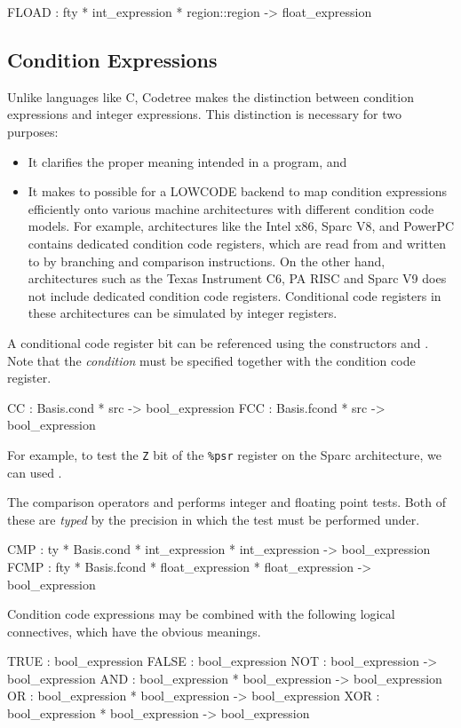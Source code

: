 \begin{SML}
   FLOAD : fty * int_expression * region::region -> float_expression
\end{SML}

\subsection{Condition Expressions}
Unlike languages like C, Codetree makes the distinction between condition 
expressions and integer expressions.  This distinction is necessary for
two purposes:
\begin{itemize}
  \item It clarifies the proper meaning intended in a program, and
  \item It makes to possible for a LOWCODE backend to map condition
expressions efficiently onto various machine architectures with different
condition code models.  For example, architectures like the Intel x86, 
Sparc V8, and PowerPC contains dedicated condition code registers, which
are read from and written to by branching and comparison instructions.
On the other hand, architectures such as the Texas Instrument C6, PA RISC
and Sparc V9 does not include dedicated condition code registers.
Conditional code registers in these architectures
can be simulated by integer registers.
\end{itemize}


A conditional code register bit can be referenced using the constructors
 and .  Note that the \emph{condition} must be specified
together with the condition code register.
\begin{SML}
   CC   : Basis.cond * src -> bool_expression 
   FCC  : Basis.fcond * src -> bool_expression    
\end{SML}
For example, to test the \verb|Z| bit of the \verb|%psr| register on the
Sparc architecture, we can used .  

The comparison operators  and  performs integer and
floating point tests.  Both of these are \emph{typed} by the precision
in which the test must be performed under.
\begin{SML}
   CMP  : ty * Basis.cond * int_expression * int_expression -> bool_expression  
   FCMP : fty * Basis.fcond * float_expression * float_expression -> bool_expression
\end{SML}

Condition code expressions may be combined with the following
logical connectives, which have the obvious meanings.
\begin{SML}
   TRUE  : bool_expression 
   FALSE : bool_expression 
   NOT   : bool_expression -> bool_expression 
   AND   : bool_expression * bool_expression -> bool_expression 
   OR    : bool_expression * bool_expression -> bool_expression 
   XOR   : bool_expression * bool_expression -> bool_expression 
\end{SML}


